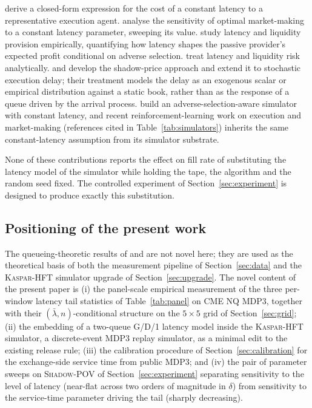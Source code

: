 \documentclass[11pt]{article}
\newcommand{\kasparhft}{\textsc{Kaspar-HFT}}
\newcommand{\shadowpov}{\textsc{Shadow-POV}}
\begin{document}
\citet{moallemisaglam2013} derive a closed-form expression for the cost of a constant latency to a representative execution agent. \citet{bergault2020} analyse the sensitivity of optimal market-making to a constant latency parameter, sweeping its value. \citet{bonartgould2017} study latency and liquidity provision empirically, quantifying how latency shapes the passive provider's expected profit conditional on adverse selection. \citet{carteajaimungalsb2021} treat latency and liquidity risk analytically. \citet{carteasb2021shadow} and \citet{carteasb2022stochastic} develop the shadow-price approach and extend it to stochastic execution delay; their treatment models the delay as an exogenous scalar or empirical distribution against a static book, rather than as the response of a queue driven by the arrival process. \citet{sun2024} build an adverse-selection-aware simulator with constant latency, and recent reinforcement-learning work on execution and market-making (references cited in Table~\ref{tab:simulators}) inherits the same constant-latency assumption from its simulator substrate.

None of these contributions reports the effect on fill rate of substituting the latency model of the simulator while holding the tape, the algorithm and the random seed fixed. The controlled experiment of Section~\ref{sec:experiment} is designed to produce exactly this substitution.

\subsection{Positioning of the present work}
\label{sec:related-positioning}

The queueing-theoretic results of \citet{dawpender2018queues} and \citet{gaozhu2024statedep} are not novel here; they are used as the theoretical basis of both the measurement pipeline of Section~\ref{sec:data} and the \kasparhft{} simulator upgrade of Section~\ref{sec:upgrade}. The novel content of the present paper is (i) the panel-scale empirical measurement of the three per-window latency tail statistics of Table~\ref{tab:panel} on CME NQ MDP3, together with their $(\bar\lambda, n)$-conditional structure on the $5 \times 5$ grid of Section~\ref{sec:grid}; (ii) the embedding of a two-queue G/D/1 latency model inside the \kasparhft{} simulator, a discrete-event MDP3 replay simulator, as a minimal edit to the existing release rule; (iii) the calibration procedure of Section~\ref{sec:calibration} for the exchange-side service time from public MDP3; and (iv) the pair of parameter sweeps on \shadowpov{} \citep{mayeski2026shadowpov} of Section~\ref{sec:experiment} separating sensitivity to the level of latency (near-flat across two orders of magnitude in $\delta$) from sensitivity to the service-time parameter driving the tail (sharply decreasing).
\end{document}
